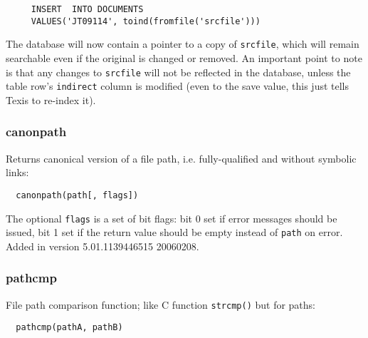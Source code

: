 \begin{verbatim}
     INSERT  INTO DOCUMENTS
     VALUES('JT09114', toind(fromfile('srcfile')))
\end{verbatim}

The database will now contain a pointer to a copy of \verb|srcfile|, which
will remain searchable even if the original is changed or removed.  An
important point to note is that any changes to \verb|srcfile| will not be
reflected in the database, unless the table row's \verb`indirect` column
is modified (even to the save value, this just tells Texis to re-index it).

\subsubsection{canonpath}

  Returns canonical version of a file path, i.e. fully-qualified and
without symbolic links:

\begin{verbatim}
  canonpath(path[, flags])
\end{verbatim}

The optional \verb`flags` is a set of bit flags: bit 0 set if error
messages should be issued, bit 1 set if the return value should be
empty instead of \verb`path` on error.  Added in version
5.01.1139446515 20060208.

\subsubsection{pathcmp}

  File path comparison function; like C function \verb`strcmp()` but
for paths:

\begin{verbatim}
  pathcmp(pathA, pathB)
\end{verbatim}

